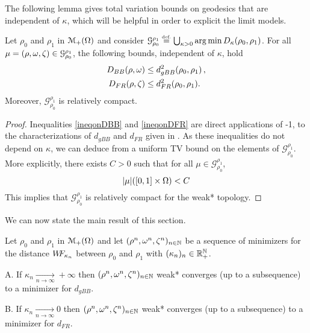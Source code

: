 \fi %
The following lemma gives total variation bounds on geodesics that are independent of $\kappa$, which will be helpful in order to explicit the limit models.

\begin{lemma}
Let $\rho_0$ and $\rho_1$ in $\mathcal{M}_+(\Omega)$ and consider $\mathcal{G}_{\rho_0}^{\rho_1} \stackrel{\mbox{\upshape\tiny def.}}{=}  \bigcup_{\kappa >0} \arg \min D_{\kappa}(\rho_0,\rho_1)$. For all $\mu=(\rho,\omega,\zeta)\in \mathcal{G}_{\rho_0}^{\rho_1}$, the following bounds, independent of $\kappa$, hold
\begin{align}
 D_{BB}(\rho,\M) & \leq d^2_{gBB}(\rho_0,\rho_1)\, ,
\label{ineqonDBB}\\
 D_{FR}(\rho,\Z) & \leq d^2_{FR}(\rho_0,\rho_1).
\label{ineqonDFR}
\end{align}
Moreover, $\mathcal{G}_{\rho_0}^{\rho_1}$ is relatively compact.
\end{lemma}

\begin{proof}
Inequalities \eqref{ineqonDBB} and \eqref{ineqonDFR} are direct applications of -1, to the characterizations of $d_{gBB}$ and $d_{FR}$ given in .
As these inequalities do not depend on $\kappa$, we can deduce from  a uniform TV bound on the elements of $\mathcal{G}_{\rho_0}^{\rho_1}$. More explicitly, there exists $C>0$ such that for all $\mu\in \mathcal{G}_{\rho_0}^{\rho_1}$,
\[
|\mu|([0,1] \times \Omega) < C
\]
This implies that $\mathcal{G}_{\rho_0}^{\rho_1}$ is relatively compact for the weak* topology.
\end{proof}

We can now state the main result of this section.

\begin{theorem}
Let $\rho_0$ and $\rho_1$ in $\mathcal{M}_+(\Omega)$ and let $(\rho^n,\omega^n,\zeta^n)_{n\in \mathbb{N}}$ be a sequence of minimizers for the distance $W\! \! F_{\kappa_n}$ between $\rho_0$ and $\rho_1$ with $(\kappa_n)_n \in \mathbb{R}_+^{\mathbb{N}}$.

A. If  $\kappa_n \underset{n \to \infty}{\to} +\infty$ then $(\rho^n,\omega^n,\zeta^n)_{n\in \mathbb{N}}$ weak* converges (up to a subsequence) to a minimizer for $d_{gBB}$.

B. If  $\kappa_n \underset{n \to \infty}{\to} 0$ then $(\rho^n,\omega^n,\zeta^n)_{n\in \mathbb{N}}$ weak* converges (up to a subsequence) to a minimizer for $d_{FR}$.
\end{theorem}

